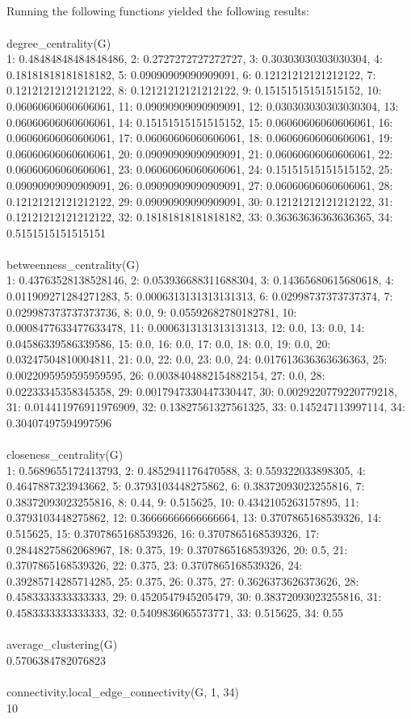 \documentclass[11pt]{article}
\begin{document}
\subsection{}
Running the following functions yielded the following results:\\
\\
degree\_centrality(G)\\
1: 0.48484848484848486, 2: 0.2727272727272727, 3: 0.30303030303030304,
4: 0.18181818181818182, 5: 0.09090909090909091, 6: 0.12121212121212122,
7: 0.12121212121212122, 8: 0.12121212121212122, 9: 0.15151515151515152,
10: 0.06060606060606061, 11: 0.09090909090909091, 12: 0.030303030303030304,
13: 0.06060606060606061, 14: 0.15151515151515152, 15: 0.06060606060606061,
16: 0.06060606060606061, 17: 0.06060606060606061, 18: 0.06060606060606061,
19: 0.06060606060606061, 20: 0.09090909090909091, 21: 0.06060606060606061,
22: 0.06060606060606061, 23: 0.06060606060606061, 24: 0.15151515151515152,
25: 0.09090909090909091, 26: 0.09090909090909091, 27: 0.06060606060606061,
28: 0.12121212121212122, 29: 0.09090909090909091, 30: 0.12121212121212122,
31: 0.12121212121212122, 32: 0.18181818181818182, 33: 0.36363636363636365,
34: 0.5151515151515151
\\\\
betweenness\_centrality(G)\\
1: 0.43763528138528146, 2: 0.053936688311688304, 3: 0.14365680615680618,
4: 0.011909271284271283, 5: 0.0006313131313131313, 6: 0.02998737373737374,
7: 0.029987373737373736, 8: 0.0, 9: 0.05592682780182781, 10: 0.0008477633477633478,
11: 0.0006313131313131313, 12: 0.0, 13: 0.0, 14: 0.04586339586339586, 15: 0.0,
16: 0.0, 17: 0.0, 18: 0.0, 19: 0.0, 20: 0.03247504810004811, 21: 0.0, 22: 0.0,
23: 0.0, 24: 0.017613636363636363, 25: 0.0022095959595959595, 26: 0.0038404882154882154,
27: 0.0, 28: 0.02233345358345358, 29: 0.0017947330447330447, 30: 0.0029220779220779218,
31: 0.014411976911976909, 32: 0.13827561327561325, 33: 0.145247113997114, 34: 0.30407497594997596
\\\\
closeness\_centrality(G)\\
1: 0.5689655172413793, 2: 0.4852941176470588, 3: 0.559322033898305,
4: 0.4647887323943662, 5: 0.3793103448275862, 6: 0.38372093023255816,
7: 0.38372093023255816, 8: 0.44, 9: 0.515625, 10: 0.4342105263157895,
11: 0.3793103448275862, 12: 0.36666666666666664, 13: 0.3707865168539326,
14: 0.515625, 15: 0.3707865168539326, 16: 0.3707865168539326, 17: 0.28448275862068967,
18: 0.375, 19: 0.3707865168539326, 20: 0.5, 21: 0.3707865168539326,
22: 0.375, 23: 0.3707865168539326, 24: 0.39285714285714285, 25: 0.375,
26: 0.375, 27: 0.3626373626373626, 28: 0.4583333333333333, 29: 0.4520547945205479,
30: 0.38372093023255816, 31: 0.4583333333333333, 32: 0.5409836065573771, 33: 0.515625, 34: 0.55
\\\\
average\_clustering(G)\\
0.5706384782076823
\\\\
connectivity.local\_edge\_connectivity(G, 1, 34)\\
10
\end{document}
